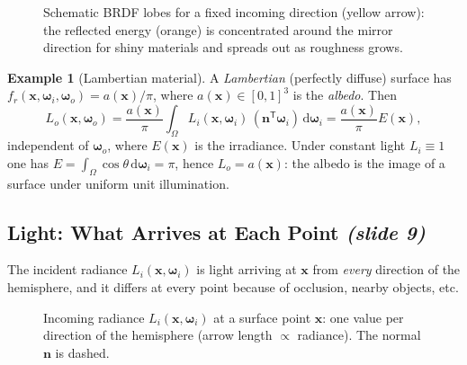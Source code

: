 \documentclass[11pt,a4paper]{article}
\newcommand{\slideone}[1]{\texorpdfstring{\emph{(slide #1)}}{(slide #1)}}
\newcommand{\x}{{\bm{x}}}
\newcommand{\wi}{{\bm{\omega}_i}}
\newcommand{\wo}{{\bm{\omega}_o}}
\newcommand{\n}{{\bm{n}}}
\newcommand{\fr}{f_r}
\newcommand{\Lo}{L_o}
\newcommand{\Li}{L_i}
\theoremstyle{definition}
\newtheorem{example}[definition]{Example}
\theoremstyle{plain}
\theoremstyle{remark}
\begin{document}
\begin{figure}[!htbp]\centering
{}
\caption{Schematic BRDF lobes for a fixed incoming direction (yellow arrow): the reflected energy (orange) is concentrated around the mirror direction for shiny materials and spreads out as roughness grows.}
\label{fig:lobes}
\end{figure}

\begin{example}[Lambertian material]
A \emph{Lambertian} (perfectly diffuse) surface has $\fr(\x,\wi,\wo)=a(\x)/\pi$, where $a(\x)\in[0,1]^3$ is the \emph{albedo}. Then
\[
 \Lo(\x,\wo)=\frac{a(\x)}{\pi}\int_\Omega \Li(\x,\wi)\,(\n^{\mathsf T}\wi)\,\mathrm d\wi=\frac{a(\x)}{\pi}E(\x),
\]
independent of $\wo$, where $E(\x)$ is the irradiance. Under constant light $\Li\equiv 1$ one has $E=\int_\Omega \cos\theta\,\mathrm d\wi=\pi$, hence $\Lo=a(\x)$: the albedo is the image of a surface under uniform unit illumination.
\end{example}

\subsection{Light: What Arrives at Each Point \slideone{9}}

The incident radiance $\Li(\x,\wi)$ is light arriving at $\x$ from \emph{every} direction of the hemisphere, and it differs at every point because of occlusion, nearby objects, etc.

\begin{figure}[!htbp]\centering
{}
\caption{Incoming radiance $\Li(\x,\wi)$ at a surface point $\x$: one value per direction of the hemisphere (arrow length $\propto$ radiance). The normal $\n$ is dashed.}
\end{figure}
\end{document}
